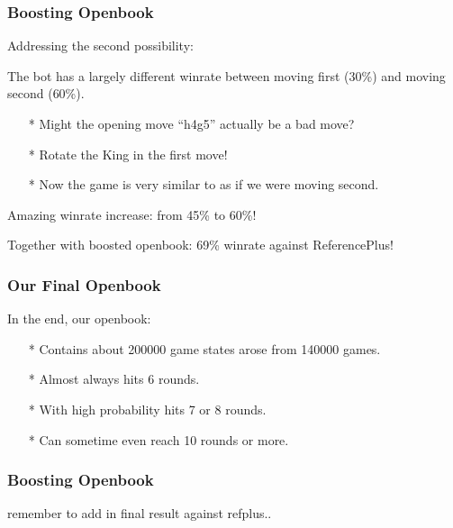 \documentclass[10pt]{beamer}
\begin{document}
	\begin{frame}
		\frametitle{Boosting Openbook}
		
		Addressing the second possibility:\pause
		
		The bot has a largely different winrate between moving first (\textcolor{dred}{30\%}) and moving second (\textcolor{fgreen}{60\%}).\pause
		
		\begin{itemize}
		\item[*] Might the opening move ``h4g5'' actually be a bad move?\pause
		\item[*] Rotate the King in the first move!\pause
		\item[*] Now the game is very similar to as if we were moving second.\pause
		\end{itemize}
		
		Amazing winrate increase: from \textcolor{dred}{45\%} to \textcolor{fgreen}{60\%}!\pause
		
		Together with boosted openbook: \textcolor{fgreen}{69\%} winrate against ReferencePlus!
	\end{frame}
	
	\begin{frame}
		\frametitle{Our Final Openbook}
		
		In the end, our openbook:\pause
		\begin{itemize}
		\item[*] Contains about \textcolor{fgreen}{200000} game states arose from \textcolor{fgreen}{140000} games.\pause
		\item[*] Almost always hits \textcolor{fgreen}{6} rounds.\pause
		\item[*] With high probability hits \textcolor{fgreen}{7} or \textcolor{fgreen}{8} rounds.\pause
		\item[*] Can sometime even reach \textcolor{fgreen}{10} rounds or more.
		\end{itemize}
	\end{frame}
	
	\begin{frame}
		\frametitle{Boosting Openbook}
		
		remember to add in final result against refplus..
	\end{frame}
	
	
	
		
\end{document}
